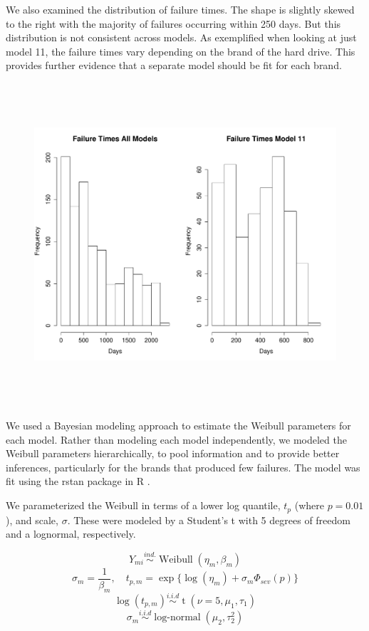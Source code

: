 \documentclass{article}
\begin{document}
\noindent We also examined the distribution of failure times.  The shape is slightly skewed to the right with the majority of failures occurring within 250 days. But this distribution is not consistent across models. As exemplified when looking at just model 11, the failure times vary depending on the brand of the hard drive.  This provides further evidence that a separate model should be fit for each brand.
\begin{figure}[H]
\centering
\includegraphics[height=12cm]{sumstat3.pdf}
\end{figure}

We used a Bayesian modeling approach to estimate the Weibull parameters for each model. Rather than modeling each model independently, we modeled the Weibull parameters hierarchically, to pool information and to provide better inferences, particularly for the brands that produced few failures. The model was fit using the rstan package in R \cite{stan}.

We parameterized the Weibull in terms of a lower log quantile, $t_p$ (where $p=0.01$), and scale, $\sigma$. These were modeled by a Student's t with 5 degrees of freedom and a lognormal, respectively.

\[Y_{mi} \stackrel{ind.}{\sim} \operatorname{Weibull}(\eta_m, \beta_m)\]
\[\sigma_m = \frac{1}{\beta_m}, \quad t_{p,m} = \exp\{\log(\eta_m) + \sigma_m \Phi_{sev}(p)\}\]
\[\log(t_{p,m}) \stackrel{i.i.d}{\sim} \operatorname{t}(\nu = 5, \mu_1, \tau_1)\]
\[\sigma_m \stackrel{i.i.d}{\sim} \operatorname{log-normal}(\mu_2, \tau^2_2)\]
\end{document}
